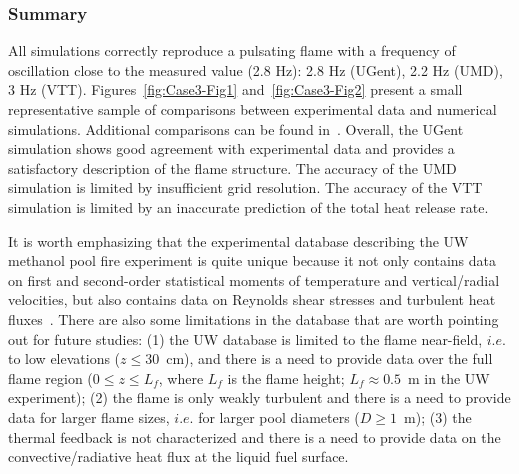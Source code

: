 \subsubsection{Summary}

All simulations correctly reproduce a pulsating flame with a frequency of oscillation close to the measured value (2.8 Hz): 2.8 Hz (UGent), 2.2 Hz (UMD), 3 Hz (VTT). Figures~\ref{fig:Case3-Fig1} and~\ref{fig:Case3-Fig2} present a small representative sample of comparisons between experimental data and numerical simulations. Additional comparisons can be found in~\cite{MaCFP_wks_presentations}. Overall, the UGent simulation shows good agreement with experimental data and provides a satisfactory description of the flame structure. The accuracy of the UMD simulation is limited by insufficient grid resolution. The accuracy of the VTT simulation is limited by an inaccurate prediction of the total heat release rate.

It is worth emphasizing that the experimental database describing the UW methanol pool fire experiment is quite unique because it not only contains data on first and second-order statistical moments of temperature and vertical/radial velocities, but also contains data on Reynolds shear stresses and turbulent heat fluxes~\cite{Case3_EXP_1,Case3_EXP_2}. There are also some limitations in the database that are worth pointing out for future studies: (1) the UW database is limited to the flame near-field, $i.e.$ to low elevations ($z \leq 30$~cm), and there is a need to provide data over the full flame region ($0 \leq z \leq L_f$, where $L_f$ is the flame height; $L_f  \approx 0.5$~m in the UW experiment); (2) the flame is only weakly turbulent and there is a need to provide data for larger flame sizes, $i.e.$ for larger pool diameters ($D \geq 1$~m); (3) the thermal feedback is not characterized and there is a need to provide data on the convective/radiative heat flux at the liquid fuel surface.




